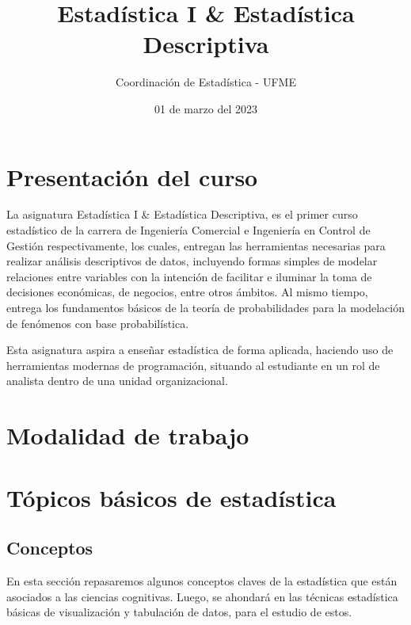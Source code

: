 \documentclass[
]{book}
\title{Estadística I \& Estadística Descriptiva}
\author{Coordinación de Estadística - UFME}
\date{01 de marzo del 2023}
\begin{document}
\maketitle

{
\setcounter{tocdepth}{1}
\tableofcontents
}
\hypertarget{presentaciuxf3n-del-curso}{%
\chapter*{Presentación del curso}\label{presentaciuxf3n-del-curso}}

La asignatura Estadística I \& Estadística Descriptiva, es el primer curso estadístico de la carrera de Ingeniería Comercial e Ingeniería en Control de Gestión respectivamente, los cuales, entregan las herramientas necesarias para realizar análisis descriptivos de datos, incluyendo formas simples de modelar relaciones entre variables con la intención de facilitar e iluminar la toma de decisiones económicas, de negocios, entre otros ámbitos. Al mismo tiempo, entrega los fundamentos básicos de la teoría de probabilidades para la modelación de fenómenos con base probabilística.

Esta asignatura aspira a enseñar estadística de forma aplicada, haciendo uso de herramientas modernas de programación, situando al estudiante en un rol de analista dentro de una unidad organizacional.

\hypertarget{modalidad-de-trabajo}{%
\chapter*{Modalidad de trabajo}\label{modalidad-de-trabajo}}

\hypertarget{tuxf3picos-buxe1sicos-de-estaduxedstica}{%
\chapter{Tópicos básicos de estadística}\label{tuxf3picos-buxe1sicos-de-estaduxedstica}}

\hypertarget{conceptos}{%
\section{Conceptos}\label{conceptos}}

En esta sección repasaremos algunos conceptos claves de la estadística que están asociados a las ciencias cognitivas. Luego, se ahondará en las técnicas estadística básicas de visualización y tabulación de datos, para el estudio de estos.
\end{document}
